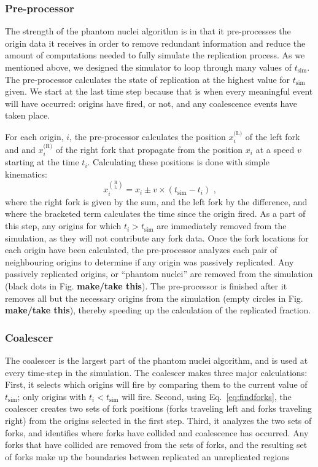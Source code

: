 		
			\subsubsection{Pre-processor}
			
			The strength of the phantom nuclei algorithm is in that it pre-processes the origin data it receives in order to remove redundant information and reduce the amount of computations needed to fully simulate the replication process.
			As we mentioned above, we designed the simulator to loop through many values of $t_\text{sim}$.
			The pre-processor calculates the state of replication at the highest value for $t_\text{sim}$ given.
			We start at the last time step because that is when every meaningful event will have occurred: origins have fired, or not, and any coalescence events have taken place.
			
			For each origin, $i$, the pre-processor calculates the position $x_i^\text{(L)}$ of the left fork and and $x_i^\text{(R)}$ of the right fork that propagate from the position $x_i$ at a speed $v$ starting at the time $t_i$.
			Calculating these positions is done with simple kinematics:
			\begin{equation} \label{eq:findforks}
				x_i^{\binom{\text{R}}{\text{L}}} = x_i \pm v \times \left( t_\text{sim} - t_i\right) \text{ ,}
			\end{equation}
			where the right fork is given by the sum, and the left fork by the difference, and where the bracketed term calculates the time since the origin fired.
			As a part of this step, any origins for which $t_i > t_\text{sim}$ are immediately removed from the simulation, as they will not contribute any fork data.
			Once the fork locations for each origin have been calculated, the pre-processor analyzes each pair of neighbouring origins to determine if any origin was passively replicated.
			Any passively replicated origins, or ``phantom nuclei'' are removed from the simulation (black dots in Fig. \textbf{make/take this}).
			The pre-processor is finished after it removes all but the necessary origins from the simulation (empty circles in Fig. \textbf{make/take this}), thereby speeding up the calculation of the replicated fraction.
			
			
			\subsubsection{Coalescer}
			
			The coalescer is the largest part of the phantom nuclei algorithm, and is used at every time-step in the simulation.
			The coalescer makes three major calculations:
			First, it selects which origins will fire by comparing them to the current value of $t_\text{sim}$; only origins with $t_i < t_\text{sim}$ will fire.
			Second, using Eq.~\ref{eq:findforks}, the coalescer creates two sets of fork positions (forks traveling left and forks traveling right) from the origins selected in the first step.
			Third, it analyzes the two sets of forks, and identifies where forks have collided and coalescence has occurred.
			Any forks that have collided are removed from the sets of forks, and the resulting set of forks make up the boundaries between replicated an unreplicated regions
			
